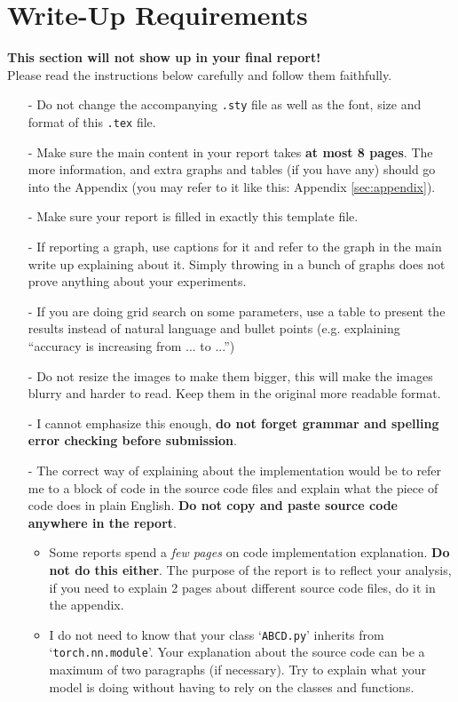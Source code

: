 \documentclass{article}
\begin{document}
\section*{Write-Up Requirements}
\textbf{This section will not show up in your final report!}\\
Please read the instructions below carefully and follow them faithfully.
    \begin{itemize}
        \item[-] Do not change the accompanying \texttt{.sty} file as well as the font, size and format of this \texttt{.tex} file.
        \item[-] Make sure the main content in your report takes \textbf{at most 8 pages}. The more information, and extra graphs and tables (if you have any) should go into the Appendix (you may refer to it like this: Appendix \ref{sec:appendix}).
        \item[-] Make sure your report is filled in exactly this template file.
        \item[-] If reporting a graph, use captions for it and refer to the graph in the main write up explaining about it. Simply throwing in a bunch of graphs does not prove anything about your experiments.
        \item[-] If you are doing grid search on some parameters, use a table to present the results instead of natural language and bullet points (e.g. explaining ``accuracy is increasing from ... to ...'')
        \item[-] Do not resize the images to make them bigger, this will make the images blurry and harder to read. Keep them in the original more readable format.
        \item[-] I cannot emphasize this enough, \textbf{do not forget grammar and spelling error checking before submission}.
        \item[-] The correct way of explaining about the implementation would be to refer me to a block of code in the source code files and explain what the piece of code does in plain English. \textbf{Do not copy and paste source code anywhere in the report}.
        \begin{itemize}
            \item Some reports spend a \textit{few pages} on code implementation explanation. \textbf{Do not do this either}. The purpose of the report is to reflect your analysis, if you need to explain 2 pages about different source code files, do it in the appendix.
            \item I do not need to know that your class `\texttt{ABCD.py}' inherits from `\texttt{torch.nn.module}'. Your explanation about the source code can be a maximum of two paragraphs (if necessary). Try to explain what your model is doing without having to rely on the classes and functions.
        \end{itemize}
    \end{itemize}
\end{document}
